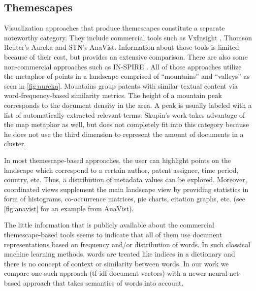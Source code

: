 \subsection{Themescapes}
Visualization approaches that produce themescapes constitute a separate noteworthy category.
They include commercial tools such as VxInsight \cite{Boyack2002}, Thomson Reuter’s Aureka and STN's AnaVist.
Information about those tools is limited because of their cost, but \cite{Ruotsalainen2008} provides an extensive comparison.
There are also some non-commercial approaches such as IN-SPIRE \cite{hetzler}. 
All of those approaches utilize the metaphor of points in a landscape comprised of ``mountains'' and ``valleys'' as seen in \autoref{fig:aureka}.
Mountains group patents with similar textual content via word-frequency-based similarity metrics.
The height of a mountain peak corresponds to the document density in the area.
A peak is usually labeled with a list of automatically extracted relevant terms.
Skupin's work takes advantage of the map metaphor as well, but does not completely fit into this category because he does not use the third dimension to represent the amount of documents in a cluster.

In most themescape-based approaches, the user can highlight points on the landscape which correspond to a certain author, patent assignee, time period, country, etc.
Thus, a distribution of metadata values can be explored.
Moreover, coordinated views supplement the main landscape view by providing statistics in form of histograms, co-occurrence matrices, pie charts, citation graphs, etc. (see \autoref{fig:anavist} for an example from AnaVist).

The little information that is publicly available about the commercial themescape-based tools seems to indicate that all of them use document representations based on frequency and/or distribution of words.
In such classical machine learning methods, words are treated like indices in a dictionary and there is no concept of context or similarity between words.
In our work we compare one such approach (\gls{tf-idf} document vectors) with a newer neural-net-based approach that takes semantics of words into account.

